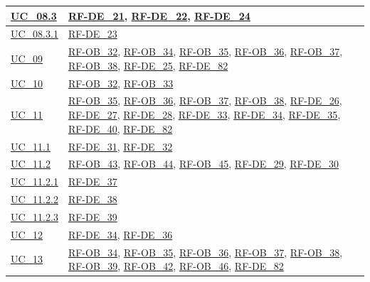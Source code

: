 \begin{longtable}{|
        >{\raggedright\arraybackslash}p{} |
        >{\raggedright\arraybackslash}p{} |
    }
    \hline
    \hyperref[uc_08.3]{UC\_08.3} & \hyperlink{rf-de_21}{RF-DE\_21}, \hyperlink{rf-de_22}{RF-DE\_22}, \hyperlink{rf-de_24}{RF-DE\_24} \\
    \hline
    \hyperref[uc_08.3.1]{UC\_08.3.1} & \hyperlink{rf-de_23}{RF-DE\_23} \\
    \hline
    \hyperref[uc_09]{UC\_09} & \hyperlink{rf-ob_32}{RF-OB\_32}, \hyperlink{rf-ob_34}{RF-OB\_34}, \hyperlink{rf-ob_35}{RF-OB\_35}, \hyperlink{rf-ob_36}{RF-OB\_36}, \hyperlink{rf-ob_37}{RF-OB\_37}, \hyperlink{rf-ob_38}{RF-OB\_38}, \hyperlink{rf-de_25}{RF-DE\_25}, \hyperlink{rf-de_82}{RF-DE\_82} \\
    \hline
    \hyperref[uc_10]{UC\_10} & \hyperlink{rf-ob_32}{RF-OB\_32}, \hyperlink{rf-ob_33}{RF-OB\_33} \\
    \hline
    \hyperref[uc_11]{UC\_11} & \hyperlink{rf-ob_35}{RF-OB\_35}, \hyperlink{rf-ob_36}{RF-OB\_36}, \hyperlink{rf-ob_37}{RF-OB\_37}, \hyperlink{rf-ob_38}{RF-OB\_38}, \hyperlink{rf-de_26}{RF-DE\_26}, \hyperlink{rf-de_27}{RF-DE\_27}, \hyperlink{rf-de_28}{RF-DE\_28}, \hyperlink{rf-de_33}{RF-DE\_33}, \hyperlink{rf-de_34}{RF-DE\_34}, \hyperlink{rf-de_35}{RF-DE\_35}, \hyperlink{rf-de_40}{RF-DE\_40}, \hyperlink{rf-de_82}{RF-DE\_82} \\
    \hline
    \hyperref[uc_11.1]{UC\_11.1} & \hyperlink{rf-de_31}{RF-DE\_31}, \hyperlink{rf-de_32}{RF-DE\_32} \\
    \hline
    \hyperref[uc_11.2]{UC\_11.2} & \hyperlink{rf-ob_43}{RF-OB\_43}, \hyperlink{rf-ob_44}{RF-OB\_44}, \hyperlink{rf-ob_45}{RF-OB\_45}, \hyperlink{rf-de_29}{RF-DE\_29}, \hyperlink{rf-de_30}{RF-DE\_30} \\
    \hline
    \hyperref[uc_11.2.1]{UC\_11.2.1} & \hyperlink{rf-de_37}{RF-DE\_37} \\
    \hline
    \hyperref[uc_11.2.2]{UC\_11.2.2} & \hyperlink{rf-de_38}{RF-DE\_38} \\
    \hline
    \hyperref[uc_11.2.3]{UC\_11.2.3} & \hyperlink{rf-de_39}{RF-DE\_39} \\
    \hline
    \hyperref[uc_12]{UC\_12} & \hyperlink{rf-de_34}{RF-DE\_34}, \hyperlink{rf-de_36}{RF-DE\_36} \\
    \hline
    \hyperref[uc_13]{UC\_13} & \hyperlink{rf-ob_34}{RF-OB\_34}, \hyperlink{rf-ob_35}{RF-OB\_35}, \hyperlink{rf-ob_36}{RF-OB\_36}, \hyperlink{rf-ob_37}{RF-OB\_37}, \hyperlink{rf-ob_38}{RF-OB\_38}, \hyperlink{rf-ob_39}{RF-OB\_39}, \hyperlink{rf-ob_42}{RF-OB\_42}, \hyperlink{rf-ob_46}{RF-OB\_46}, \hyperlink{rf-de_82}{RF-DE\_82} \\

\end{longtable}
